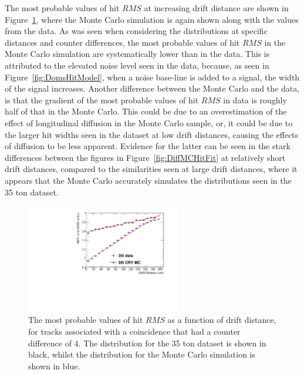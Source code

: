 The most probable values of hit $RMS$ at increasing drift distance are shown in Figure~\ref{fig:DiffMCDataCompFit}, where the Monte Carlo simulation is again shown along with the values from the data. As was seen when considering the distributions at specific distances and counter differences, the most probable values of hit $RMS$ in the Monte Carlo simulation are systematically lower than in the data. This is attributed to the elevated noise level seen in the data, because, as seen in Figure~\ref{fig:DomsHitModel}, when a noise base-line is added to a signal, the width of the signal increases. Another difference between the Monte Carlo and the data, is that the gradient of the most probable values of hit $RMS$ in data is roughly half of that in the Monte Carlo. This could be due to an overestimation of the effect of longitudinal diffusion in the Monte Carlo sample, or, it could be due to the larger hit widths seen in the dataset at low drift distances, causing the effects of diffusion to be less apparent. Evidence for the latter can be seen in the stark differences between the figures in Figure~\ref{fig:DiffMCHitFit} at relatively short drift distances, compared to the similarities seen at large drift distances, where it appears that the Monte Carlo accurately simulates the distributions seen in the 35 ton dataset. \\

\begin{figure}
  \centering
  \includegraphics[width=0.6\textwidth]{CounterDiff4_Overlay}
  \caption[The drift distance dependence of diffusion in the 35 ton dataset and Monte Carlo for coincidences with a counter difference of 4]
          {The most probable values of hit $RMS$ as a function of drift distance, for tracks associated with a coincidence that had a counter difference of 4. The distribution for the 35 ton dataset is shown in black, whilst the distribution for the Monte Carlo simulation is shown in blue.}
  \label{fig:DiffMCDataCompFit}
\end{figure}

